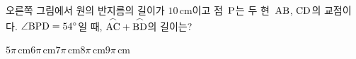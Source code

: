\noindent\begin{minipage}[t]{0.58\linewidth}\vspace{0pt}\raggedright 오른쪽 그림에서 원의 반지름의 길이가 $10\,\mathrm{cm}$이고 점~$\mathrm{P}$는 두 현~$\mathrm{AB}$, $\mathrm{CD}$의 교점이다. $\angle\mathrm{BPD}=54^\circ$일 때, $\overset{\frown}{\mathrm{AC}}+\overset{\frown}{\mathrm{BD}}$의 길이는?\end{minipage}\hfill\begin{minipage}[t]{0.4\linewidth}\vspace{0pt}\centering \resizebox{\ifdim\width>\linewidth\linewidth\else\width\fi}{!}{}\end{minipage}\par
\begin{choicesii}{$5\pi\,\mathrm{cm}$}{$6\pi\,\mathrm{cm}$}{$7\pi\,\mathrm{cm}$}{$8\pi\,\mathrm{cm}$}{$9\pi\,\mathrm{cm}$}\end{choicesii}
